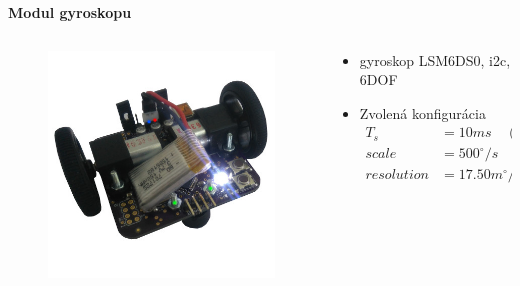\documentclass[xcolor=dvipsnames]{beamer}
\begin{document}
\begin{frame}{\bf Modul gyroskopu}


\begin{columns}

  \begin{column}{0.5\textwidth}

      \begin{figure}[ht]
      \begin{center}
      \begin{minipage}{0.8\linewidth}
      \begin{center}
      \includegraphics[width=1.0\textwidth]{gyro_module.jpg}
      \end{center}
      \end{minipage}
      \end{center}
      \end{figure}

  \end{column}


  \begin{column}{0.5\textwidth}

  \begin{itemize}
    \item gyroskop LSM6DS0, i2c, 6DOF
    \item Zvolená konfigurácia
          \begin{align*}
            T_s &= 10ms \quad (1ms) \\
            scale &= 500^{\circ}/s \quad (2000^{\circ}/s) \\
            resolution &= 17.50 m^{\circ} / bit \quad (8.75 m^{\circ} / bit)
          \end{align*}

  \end{itemize}

  \end{column}
\end{columns}


\end{frame}
\end{document}
